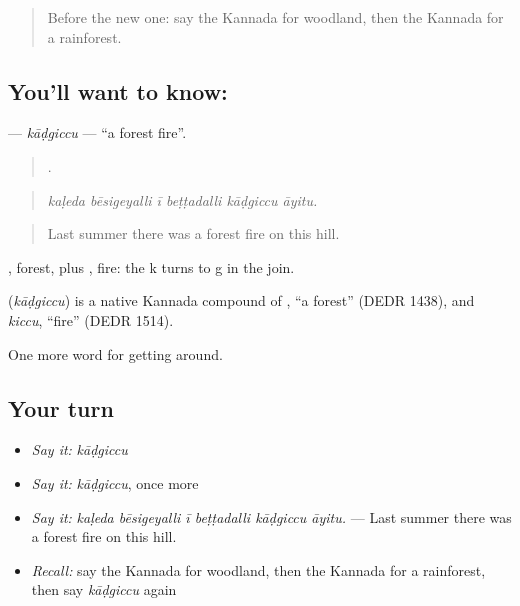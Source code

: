 \label{lesson:KA-C475-kadgiccu}



\begin{quote}
Before the new one: say the Kannada for woodland, then the Kannada for a rainforest.
\end{quote}

\subsection*{You'll want to know: }
\textbf{} — \emph{kāḍgiccu} — \textquotedblleft{}a forest fire\textquotedblright{}.

\begin{quote}
     .
\end{quote}

\begin{quote}
\emph{kaḷeda bēsigeyalli ī beṭṭadalli kāḍgiccu āyitu.}
\end{quote}

\begin{quote}
Last summer there was a forest fire on this hill.
\end{quote}

, forest, plus , fire: the k turns to g in the join.

\begin{cousinweb}
\textbf{} (\emph{kāḍgiccu}) is a native Kannada compound of , \textquotedblleft{}a forest\textquotedblright{} (DEDR 1438), and \emph{kiccu}, \textquotedblleft{}fire\textquotedblright{} (DEDR 1514).
\end{cousinweb}

\begin{grammarlens}[title={What you've built}]
One more word for getting around.
\end{grammarlens}

\subsection*{Your turn}
\begin{itemize}
\raggedright
  \item \emph{Say it:} \emph{kāḍgiccu}
  \item \emph{Say it:} \emph{kāḍgiccu}, once more
  \item \emph{Say it:} \emph{kaḷeda bēsigeyalli ī beṭṭadalli kāḍgiccu āyitu.} — Last summer there was a forest fire on this hill.
  \item \emph{Recall:} say the Kannada for woodland, then the Kannada for a rainforest, then say \emph{kāḍgiccu} again
\end{itemize}

